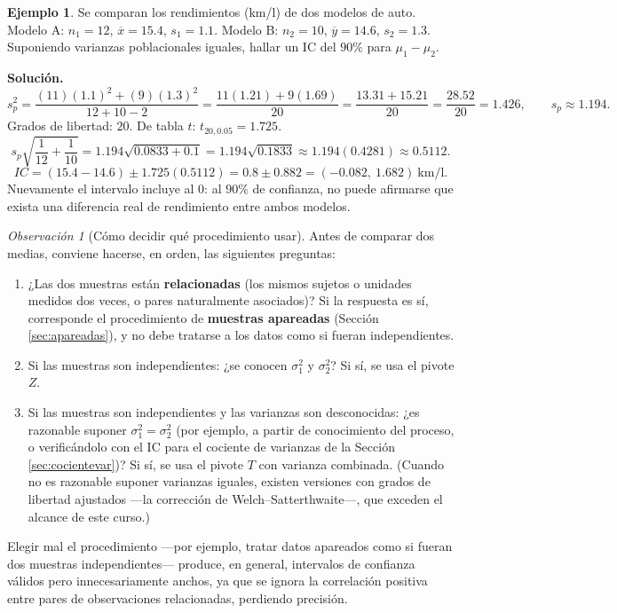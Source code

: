 \documentclass[11pt,a4paper]{article}
\theoremstyle{plain}
\theoremstyle{definition}
\newtheorem{ejemplo}[teorema]{Ejemplo}
\theoremstyle{remark}
\newtheorem{observacion}[teorema]{Observación}
\begin{document}
\begin{ejemplo}
Se comparan los rendimientos (km/l) de dos modelos de auto. Modelo A: $n_1=12$, $\overline x=15.4$, $s_1=1.1$. Modelo B: $n_2=10$, $\overline y=14.6$, $s_2=1.3$. Suponiendo varianzas poblacionales iguales, hallar un IC del $90\%$ para $\mu_1-\mu_2$.

\textbf{Solución.}
\[
s_p^2 = \frac{(11)(1.1)^2+(9)(1.3)^2}{12+10-2} = \frac{11(1.21)+9(1.69)}{20} = \frac{13.31+15.21}{20} = \frac{28.52}{20}=1.426, \qquad s_p\approx 1.194.
\]
Grados de libertad: $20$. De tabla $t$: $t_{20,0.05}=1.725$.
\[
s_p\sqrt{\frac{1}{12}+\frac{1}{10}} = 1.194\sqrt{0.0833+0.1} = 1.194\sqrt{0.1833} \approx 1.194(0.4281)\approx 0.5112.
\]
\[
IC = (15.4-14.6)\pm 1.725(0.5112) = 0.8\pm 0.882 = (-0.082,\ 1.682)\ \text{km/l}.
\]
Nuevamente el intervalo incluye al $0$: al $90\%$ de confianza, no puede afirmarse que exista una diferencia real de rendimiento entre ambos modelos.
\end{ejemplo}

\begin{observacion}[Cómo decidir qué procedimiento usar]
Antes de comparar dos medias, conviene hacerse, en orden, las siguientes preguntas:
\begin{enumerate}[label=\arabic*)]
\item ¿Las dos muestras están \textbf{relacionadas} (los mismos sujetos o unidades medidos dos veces, o pares naturalmente asociados)? Si la respuesta es sí, corresponde el procedimiento de \textbf{muestras apareadas} (Sección \ref{sec:apareadas}), y no debe tratarse a los datos como si fueran independientes.
\item Si las muestras son independientes: ¿se conocen $\sigma_1^2$ y $\sigma_2^2$? Si sí, se usa el pivote $Z$.
\item Si las muestras son independientes y las varianzas son desconocidas: ¿es razonable suponer $\sigma_1^2=\sigma_2^2$ (por ejemplo, a partir de conocimiento del proceso, o verificándolo con el IC para el cociente de varianzas de la Sección \ref{sec:cocientevar})? Si sí, se usa el pivote $T$ con varianza combinada. (Cuando no es razonable suponer varianzas iguales, existen versiones con grados de libertad ajustados —la corrección de Welch--Satterthwaite—, que exceden el alcance de este curso.)
\end{enumerate}
Elegir mal el procedimiento —por ejemplo, tratar datos apareados como si fueran dos muestras independientes— produce, en general, intervalos de confianza válidos pero innecesariamente anchos, ya que se ignora la correlación positiva entre pares de observaciones relacionadas, perdiendo precisión.
\end{observacion}
\end{document}
